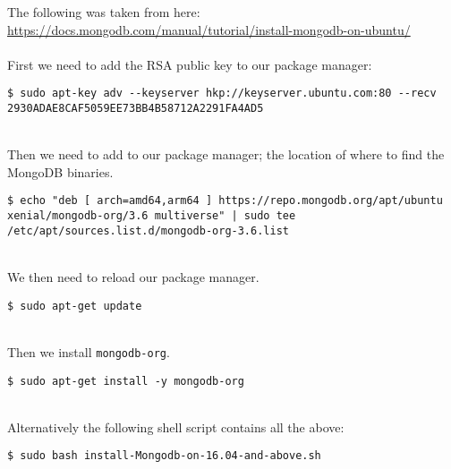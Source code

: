 The following was taken from here:
\\
\url{https://docs.mongodb.com/manual/tutorial/install-mongodb-on-ubuntu/}
\\
\\
First we need to add the RSA public key to our package manager:
\begin{lstlisting}[backgroundcolor = \color{light-gray}]
$ sudo apt-key adv --keyserver hkp://keyserver.ubuntu.com:80 --recv 2930ADAE8CAF5059EE73BB4B58712A2291FA4AD5
\end{lstlisting}
~\\
Then we need to add to our package manager; the location of where to find the MongoDB binaries.
\begin{lstlisting}[backgroundcolor = \color{light-gray}]
$ echo "deb [ arch=amd64,arm64 ] https://repo.mongodb.org/apt/ubuntu xenial/mongodb-org/3.6 multiverse" | sudo tee /etc/apt/sources.list.d/mongodb-org-3.6.list
\end{lstlisting}
~\\
We then need to reload our package manager.
\begin{lstlisting}[backgroundcolor = \color{light-gray}]
$ sudo apt-get update
\end{lstlisting}
~\\
Then we install \texttt{mongodb-org}.
\begin{lstlisting}[backgroundcolor = \color{light-gray}]
$ sudo apt-get install -y mongodb-org
\end{lstlisting}
~\\
Alternatively the following shell script contains all the above:
\begin{lstlisting}[backgroundcolor = \color{light-gray}]
$ sudo bash install-Mongodb-on-16.04-and-above.sh
\end{lstlisting}
~\\


\leavevmode
\newline
